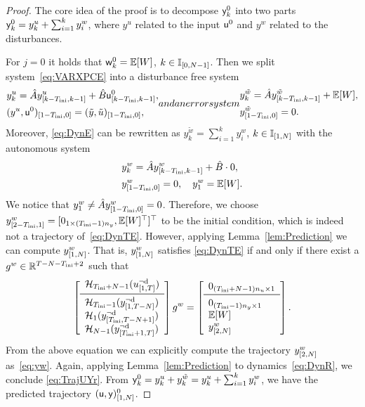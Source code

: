 \begin{proof}
    The core idea of the proof is to decompose $\mathsf{y}_k^0$ into two parts $\mathsf{y}_k^0=y_k^u + \sum_{i=1}^{k}y_i^{w}$, where $y^u$ related to the input $\mathsf{u}^0$ and $y^w$ related to the disturbances.
	
	For $j=0$ it holds that $\mathsf{w}_k^0=\mathbb{E}[W]$, $k\in\mathbb{I}_{[0,N-1]}$. Then we split system~\eqref{eq:VARXPCE} into a disturbance free system
	\begin{subequations}
		\begin{align}
			&y_k^u = \hat{A}\tra{y^u}{k-\tini}{k-1} + \hat{B}\tra{\pce{u}^0}{k-\tini}{k-1}, \label{eq:DynR}\\
			&\tra{(y^u,\pce{u}^0)}{1-\tini}{0} = \tra{(\tilde{y},\tilde{u})}{1-\tini}{0},
		\end{align}
	and an error system
		\begin{align}
			&y_k^{\tilde{w}} = \hat{A}\tra{y^{\tilde{w}}}{k-\tini}{k-1} + \mean[W],  \label{eq:DynE}\\
			&\tra{y^{\tilde{w}}}{1-\tini}{0} = 0.
		\end{align}
	\end{subequations}
	Moreover, \eqref{eq:DynE}  can be rewritten as $y^{\tilde{w}}_k = \sum_{i=1}^{k}y^w_i$, $k\in\mathbb{I}_{[1,N]}$ with the autonomous system
	\begin{subequations}
			\begin{align}
					&y^w_k = \hat{A}y^w_{[k-T_\text{ini},k-1]}+\hat{B}\cdot0,\label{eq:DynTE}\\
					&y^w_{[1-T_\text{ini},0]} = 0,\quad y_1^w =\mathbb{E}[W].
				\end{align}
		\end{subequations}
	We notice that $y^w_1 \neq \hat{A}y^w_{[1-T_\text{ini},0]}=0$. Therefore, we choose $y^w_{[2-T_\text{ini},1]}=[0_{1\times(T_\text{ini}-1){n_y}},\mathbb{E}[W]^\top]^\top$ to be the initial condition, which is indeed not a trajectory of~\eqref{eq:DynTE}. However, applying Lemma~\ref{lem:Prediction} we can compute $y^w_{[1,N]}$. That is, $y^w_{[1,N]}$ satisfies \eqref{eq:DynTE} if and only if there exist a $g^w\in\mathbb{R}^{T-N-T_\text{ini}+2}$ such that  
	\[
	 \left[\begin{array}{ll} \Hankel_{\tini+N-1}(\traud{u}{1}{T}) \\ \midrule \Hankel_{\tini-1}(\traud{y}{1}{T-N})\\ \Hankel_{1}(\traud{y}{\tini}{T-N+1}) \\ \Hankel_{N-1}(\traud{y}{\tini+1}{T}) \end{array}\right] g^w =
	 \left[\begin{array}{ll}  0_{(\tini+N-1)\dimu\times1} \\ \midrule 0_{(\tini-1)\dimy\times1} \\ \mean[W] \\ \tra{y^w}{2}{N} \end{array}\right].
	\]
	From the above equation we can explicitly compute the trajectory $y^w_{[2,N]}$ as~\eqref{eq:yw}.
	Again, applying Lemma~\ref{lem:Prediction} to dynamics~\eqref{eq:DynR}, we conclude \eqref{eq:TrajUYr}. From $\mathsf{y}_k^0=y_k^u+y_k^{\tilde{w}}=y_k^u+\sum_{i=1}^{k}y_i^w$, we have the predicted trajectory $(\mathsf{u},\mathsf{y})^0_{[1,N]}$.
\end{proof}

